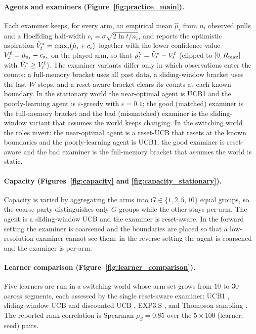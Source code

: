 \paragraph{Agents and examiners (Figure~\ref{fig:practice_main}).} Each examiner keeps, for every arm, an empirical mean $\hat\mu_i$ from $n_i$ observed pulls and a Hoeffding half-width $c_i = \sigma\sqrt{2\ln t / n_i}$, and reports the optimistic aspiration $\tilde{V}^*_t = \max_i(\hat\mu_i + c_i)$ together with the lower confidence value $V^{\ell}_t = \hat\mu_{a_t} - c_{a_t}$ on the played arm, so that $\rho^\chi_t = \tilde{V}^*_t - V^{\ell}_t$ (clipped to $[0,R_{\max}]$ with $\tilde{V}^*_t \ge V^{\ell}_t$). The examiner variants differ only in which observations enter the counts: a full-memory bracket uses all past data, a sliding-window bracket uses the last $W$ steps, and a reset-aware bracket clears its counts at each known boundary. In the stationary world the near-optimal agent is UCB1 \citep{auer2002ucb} and the poorly-learning agent is $\varepsilon$-greedy with $\varepsilon = 0.1$; the good (matched) examiner is the full-memory bracket and the bad (mismatched) examiner is the sliding-window variant that assumes the world keeps changing. In the switching world the roles invert: the near-optimal agent is a reset-UCB that resets at the known boundaries and the poorly-learning agent is UCB1; the good examiner is reset-aware and the bad examiner is the full-memory bracket that assumes the world is static.

\paragraph{Capacity (Figures~\ref{fig:capacity} and \ref{fig:capacity_stationary}).} Capacity is varied by aggregating the arms into $G \in \{1,2,5,10\}$ equal groups, so the coarse party distinguishes only $G$ groups while the other stays per-arm. The agent is a sliding-window UCB and the examiner is reset-aware. In the forward setting the examiner is coarsened and the boundaries are placed so that a low-resolution examiner cannot see them; in the reverse setting the agent is coarsened and the examiner is per-arm.

\paragraph{Learner comparison (Figure~\ref{fig:learner_comparison}).} Five learners are run in a switching world whose arm set grows from $10$ to $30$ across segments, each assessed by the single reset-aware examiner: UCB1 \citep{auer2002ucb}, sliding-window UCB and discounted UCB \citep{garivier2011switching}, EXP3.S \citep{auer2002nonstochastic}, and Thompson sampling \citep{thompson1933likelihood}. The reported rank correlation is Spearman $\rho_S = 0.85$ over the $5\times100$ (learner, seed) pairs.

